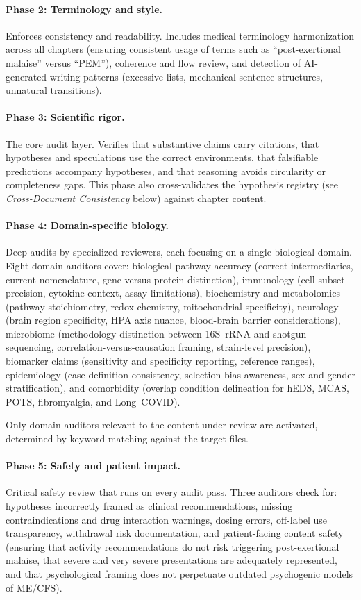 \paragraph{Phase 2: Terminology and style.}
Enforces consistency and readability. Includes medical terminology harmonization across all chapters (ensuring consistent usage of terms such as ``post-exertional malaise'' versus ``PEM''), coherence and flow review, and detection of AI-generated writing patterns (excessive lists, mechanical sentence structures, unnatural transitions).

\paragraph{Phase 3: Scientific rigor.}
The core audit layer. Verifies that substantive claims carry citations, that hypotheses and speculations use the correct environments, that falsifiable predictions accompany hypotheses, and that reasoning avoids circularity or completeness gaps. This phase also cross-validates the hypothesis registry (see \emph{Cross-Document Consistency} below) against chapter content.

\paragraph{Phase 4: Domain-specific biology.}
Deep audits by specialized reviewers, each focusing on a single biological domain. Eight domain auditors cover: biological pathway accuracy (correct intermediaries, current nomenclature, gene-versus-protein distinction), immunology (cell subset precision, cytokine context, assay limitations), biochemistry and metabolomics (pathway stoichiometry, redox chemistry, mitochondrial specificity), neurology (brain region specificity, HPA axis nuance, blood-brain barrier considerations), microbiome (methodology distinction between 16S~rRNA and shotgun sequencing, correlation-versus-causation framing, strain-level precision), biomarker claims (sensitivity and specificity reporting, reference ranges), epidemiology (case definition consistency, selection bias awareness, sex and gender stratification), and comorbidity (overlap condition delineation for hEDS, MCAS, POTS, fibromyalgia, and Long~COVID).

Only domain auditors relevant to the content under review are activated, determined by keyword matching against the target files.

\paragraph{Phase 5: Safety and patient impact.}
Critical safety review that runs on every audit pass. Three auditors check for: hypotheses incorrectly framed as clinical recommendations, missing contraindications and drug interaction warnings, dosing errors, off-label use transparency, withdrawal risk documentation, and patient-facing content safety (ensuring that activity recommendations do not risk triggering post-exertional malaise, that severe and very severe presentations are adequately represented, and that psychological framing does not perpetuate outdated psychogenic models of ME/CFS).

